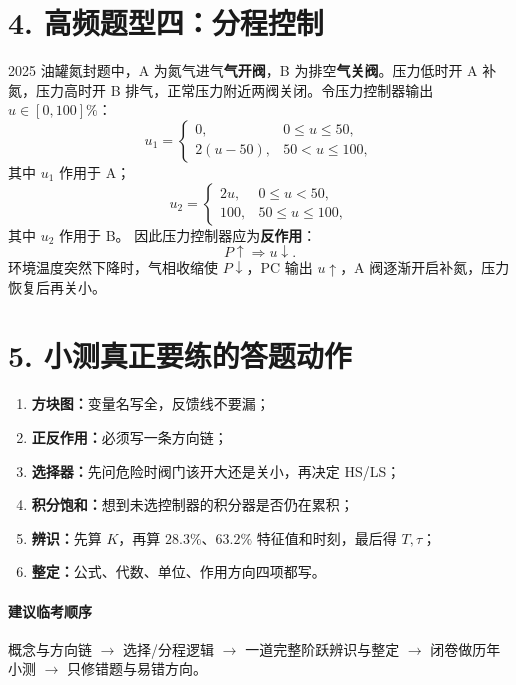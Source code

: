 \documentclass[UTF8,a4paper,10.5pt]{ctexart}
\begin{document}
\section*{4. 高频题型四：分程控制}
2025 油罐氮封题中，A 为氮气进气\textbf{气开阀}，B 为排空\textbf{气关阀}。压力低时开 A 补氮，压力高时开 B 排气，正常压力附近两阀关闭。令压力控制器输出 $u\in[0,100]\%$：
\[
u_1=\begin{cases}
0,&0\le u\le50,\\
2(u-50),&50<u\le100,
\end{cases}
\]
其中 $u_1$ 作用于 A；
\[
u_2=\begin{cases}
2u,&0\le u<50,\\
100,&50\le u\le100,
\end{cases}
\]
其中 $u_2$ 作用于 B。
因此压力控制器应为\textbf{反作用}：
\[
P\uparrow\Rightarrow u\downarrow.
\]
环境温度突然下降时，气相收缩使 $P\downarrow$，PC 输出 $u\uparrow$，A 阀逐渐开启补氮，压力恢复后再关小。

\section*{5. 小测真正要练的答题动作}
\begin{enumerate}[leftmargin=2em,itemsep=3pt]
\item \textbf{方块图：}变量名写全，反馈线不要漏；
\item \textbf{正反作用：}必须写一条方向链；
\item \textbf{选择器：}先问危险时阀门该开大还是关小，再决定 HS/LS；
\item \textbf{积分饱和：}想到未选控制器的积分器是否仍在累积；
\item \textbf{辨识：}先算 $K$，再算 $28.3\%$、$63.2\%$ 特征值和时刻，最后得 $T,\tau$；
\item \textbf{整定：}公式、代数、单位、作用方向四项都写。
\end{enumerate}

\paragraph{建议临考顺序}
概念与方向链 $\rightarrow$ 选择/分程逻辑 $\rightarrow$ 一道完整阶跃辨识与整定 $\rightarrow$ 闭卷做历年小测 $\rightarrow$ 只修错题与易错方向。
\end{document}
